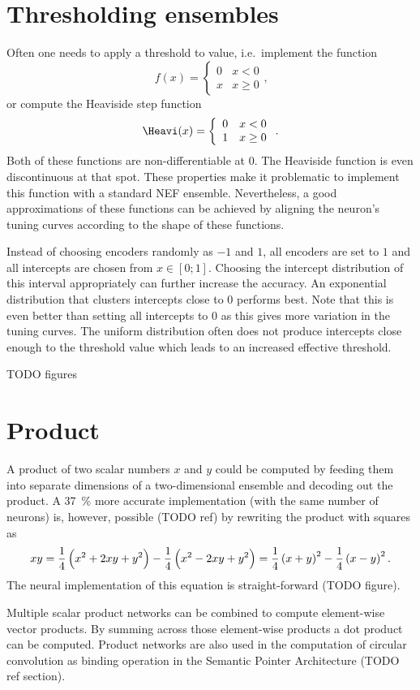 \section{Thresholding ensembles}\label{sec:thresholding}
Often one needs to apply a threshold to value, i.e.\ implement the function
\begin{equation}
    f(x) = \left\{ \begin{array}{ll}
            0 & x < 0 \\
            x & x \geq 0
        \end{array} \right.
    \text{,}
\end{equation}
or compute the Heaviside step function
\begin{equation}
    \Heavi(x) = \left\{ \begin{array}{ll}
            0 & x < 0 \\
            1 & x \geq 0
        \end{array} \right.
    \text{.}
\end{equation}
Both of these functions are non-differentiable at 0.
The Heaviside function is even discontinuous at that spot.
These properties make it problematic to implement this function with a standard NEF ensemble.
Nevertheless, a good approximations of these functions can be achieved by aligning the neuron's tuning curves according to the shape of these functions.

Instead of choosing encoders randomly as $-1$ and $1$, all encoders are set to $1$ and all intercepts are chosen from $x \in [0; 1]$.
Choosing the intercept distribution of this interval appropriately can further increase the accuracy.
An exponential distribution that clusters intercepts close to 0 performs best.
Note that this is even better than setting all intercepts to 0 as this gives more variation in the tuning curves.
The uniform distribution often does not produce intercepts close enough to the threshold value which leads to an increased effective threshold.

TODO figures

\section{Product}
A product of two scalar numbers $x$ and $y$ could be computed by feeding them into separate dimensions of a two-dimensional ensemble and decoding out the product.
A \SI{37}{\percent} more accurate implementation (with the same number of neurons) is, however, possible (TODO ref) by rewriting the product with squares as
\begin{equation}
    xy = \frac{1}{4}\del{x^2 + 2xy + y^2} - \frac{1}{4}\del{x^2 - 2xy + y^2} = \frac{1}{4}\del{x + y}^2 - \frac{1}{4}\del{x - y}^2 \text{.}
\end{equation}
The neural implementation of this equation is straight-forward (TODO figure).

Multiple scalar product networks can be combined to compute element-wise vector products.
By summing across those element-wise products a dot product can be computed.
Product networks are also used in the computation of circular convolution as binding operation in the Semantic Pointer Architecture (TODO ref section).
